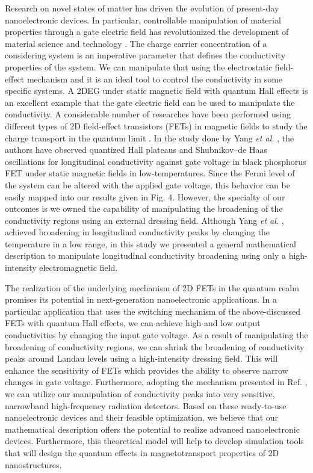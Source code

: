 \documentclass{article}
\begin{document}
\begin{itemize}
{  Research on novel states of matter has driven the evolution of present-day nanoelectronic devices. In particular, controllable manipulation of material properties through a gate electric field has revolutionized the development of material science and technology \cite{ahn03,deng18}.
  The charge carrier concentration of a considering system is an imperative parameter that defines the conductivity properties of the system. We can manipulate that using the electrostatic field-effect mechanism and it is an ideal tool to control the conductivity in some specific systems.
  A 2DEG under static magnetic field with quantum Hall effects is an excellent example that the gate electric field can be used to manipulate the conductivity. A considerable number of researches have been performed using different types of 2D field-effect transistors (FETs) in magnetic fields to study the charge transport in the quantum limit \cite{wakabayashi78,yang18,long20,li14}. In the study done by Yang \textit{et al.} \cite{yang18}, the authors have observed quantized Hall plateaus and Shubnikov–de Haas oscillations for longitudinal conductivity against gate voltage in black phosphorus FET under static magnetic fields in low-temperatures. Since the Fermi level of the system can be altered with the applied gate voltage, this behavior can be easily mapped into our results given in Fig. 4. However, the specialty of our outcomes is we owned the capability of manipulating the broadening of the conductivity regions using an external dressing field. Although Yang \textit{et al.} \cite{yang18}, achieved broadening in longitudinal conductivity peaks by changing the temperature in a low range, in this study we presented a general mathematical description to manipulate longitudinal conductivity broadening using only a high-intensity electromagnetic field.

  The realization of the underlying mechanism of 2D FETs in the quantum realm promises its potential in next-generation nanoelectronic applications. In a particular application that uses the switching mechanism of the above-discussed FETs with quantum Hall effects, we can achieve high and low output conductivities by changing the input gate voltage. As a result of manipulating the broadening of conductivity regions, we can shrink the broadening of conductivity peaks around Landau levels using a high-intensity dressing field. This will enhance the sensitivity of FETs which provides the ability to observe narrow changes in gate voltage.
  Furthermore, adopting the mechanism presented in Ref. \cite{hirakawa01}, we can utilize our manipulation of conductivity peaks into very sensitive, narrowband high-frequency radiation detectors.
  Based on these ready-to-use nanoelectronic devices and their feasible optimization, we believe that our mathematical description offers the potential to realize advanced nanoelectronic devices. Furthermore, this theoretical model will help to develop simulation tools that will design the quantum effects in magnetotransport properties of 2D nanostructures.
  }
\end{itemize}
\end{document}
